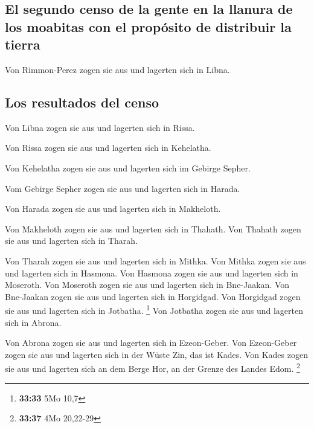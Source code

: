 \hypertarget{el-segundo-censo-de-la-gente-en-la-llanura-de-los-moabitas-con-el-propuxf3sito-de-distribuir-la-tierra}{%
\subsection{El segundo censo de la gente en la llanura de los moabitas
con el propósito de distribuir la
tierra}\label{el-segundo-censo-de-la-gente-en-la-llanura-de-los-moabitas-con-el-propuxf3sito-de-distribuir-la-tierra}}

 Von Rimmon-Perez zogen sie aus und lagerten sich in
Libna.

\hypertarget{los-resultados-del-censo-1}{%
\subsection{Los resultados del censo}\label{los-resultados-del-censo-1}}

 Von Libna zogen sie aus und lagerten sich in Rissa.

 Von Rissa zogen sie aus und lagerten sich in Kehelatha.

 Von Kehelatha zogen sie aus und lagerten sich im Gebirge
Sepher.

 Vom Gebirge Sepher zogen sie aus und lagerten sich in
Harada.

 Von Harada zogen sie aus und lagerten sich in Makheloth.

 Von Makheloth zogen sie aus und lagerten sich in
Thahath.  Von Thahath zogen sie aus und lagerten sich in
Tharah.

 Von Tharah zogen sie aus und lagerten sich in Mithka.
 Von Mithka zogen sie aus und lagerten sich in Hasmona.
 Von Hasmona zogen sie aus und lagerten sich in Moseroth.
 Von Moseroth zogen sie aus und lagerten sich in
Bne-Jaakan.  Von Bne-Jaakan zogen sie aus und lagerten
sich in Horgidgad.  Von Horgidgad zogen sie aus und
lagerten sich in Jotbatha. \footnote{\textbf{33:33} 5Mo 10,7}
 Von Jotbatha zogen sie aus und lagerten sich in Abrona.

 Von Abrona zogen sie aus und lagerten sich in
Ezeon-Geber.  Von Ezeon-Geber zogen sie aus und lagerten
sich in der Wüste Zin, das ist Kades.  Von Kades zogen
sie aus und lagerten sich an dem Berge Hor, an der Grenze des Landes
Edom. \footnote{\textbf{33:37} 4Mo 20,22-29}

